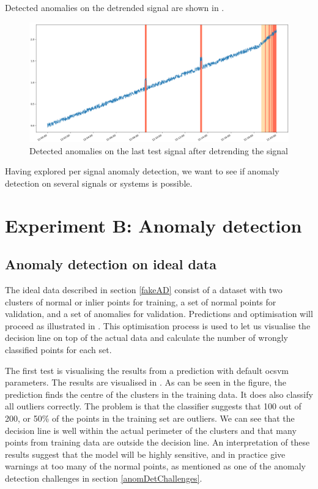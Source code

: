 \documentclass[english, a4paper]{report}
\begin{document}
{{{            Detected anomalies on the detrended signal are shown in .
            
            \begin{figure}[H]
                \centering
                \includegraphics[width=\textwidth]{AnomType5Res}
                \caption{Detected anomalies on the last test signal after detrending the signal}
                \label{fig:AnomType5Res}
            \end{figure}
            
            Having explored per signal anomaly detection, we want to see if anomaly detection on several signals or systems is possible. 
        }
    }
        
    \section{Experiment B: Anomaly detection}\label{AnomalyDetectionResult}
    {
        \subsection{Anomaly detection on ideal data}
        {
            The ideal data described in section \ref{fakeAD} consist of a dataset with two clusters of normal or inlier points for training, a set of normal points for validation, and a set of anomalies for validation. Predictions and  optimisation will proceed as illustrated in . This optimisation process is used to let us visualise the decision line on top of the actual data and calculate the number of wrongly classified points for each set. 
            \par
            The first test is visualising the results from a prediction with default \gls{ocsvm} parameters. The results are visualised in . As can be seen in the figure, the prediction finds the centre of the clusters in the training data. It does also classify all outliers correctly. The problem is that the classifier suggests that 100 out of 200, or 50\% of the points in the training set are outliers. We can see that the decision line is well within the actual perimeter of the clusters and that many points from training data are outside the decision line. An interpretation of these results suggest that the model will be highly sensitive, and in practice give warnings at too many of the normal points, as mentioned as one of the anomaly detection challenges in section \ref{anomDetChallenges}. 
            
}}}
\end{document}
